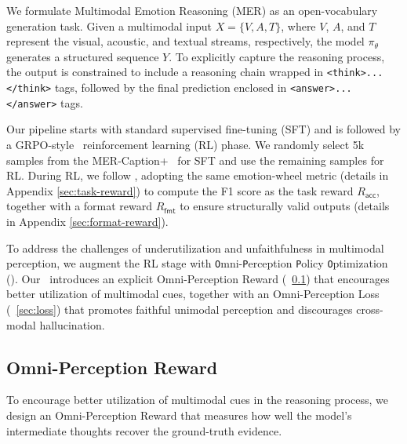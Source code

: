 \documentclass{article}
\theoremstyle{plain}
\theoremstyle{definition}
\theoremstyle{remark}
\begin{document}
We formulate Multimodal Emotion Reasoning (MER) as an open-vocabulary generation task. Given a multimodal input $X = \{V, A, T\}$, where $V$, $A$, and $T$ represent the visual, acoustic, and textual streams, respectively, the model $\pi_\theta$ generates a structured sequence $Y$. To explicitly capture the reasoning process, the output is constrained to include a reasoning chain wrapped in \texttt{<think>...</think>} tags, followed by the final prediction enclosed in \texttt{<answer>...</answer>} tags.

Our pipeline starts with standard supervised fine-tuning (SFT) and is followed by a GRPO-style~\cite{guo2025deepseek} reinforcement learning (RL) phase. We randomly select 5k samples from the MER-Caption+~\cite{lian2025affectgpt} for SFT and use the remaining samples for RL. During RL, we follow \citet{lian2025affectgpt}, adopting the same emotion-wheel metric (details in Appendix \ref{sec:task-reward}) to compute the F1 score as the task reward $R_\mathsf{acc}$, together with a format reward $R_\mathsf{fmt}$ to ensure structurally valid outputs (details in Appendix \ref{sec:format-reward}).



To address the challenges of underutilization and unfaithfulness in multimodal perception, we augment the RL stage with \texttt{O}mni-\texttt{P}erception \texttt{P}olicy \texttt{O}ptimization (\ourmethod). Our \ourmethod~introduces an explicit Omni-Perception Reward (~\cref{sec:reward}) that encourages better utilization of multimodal cues, together with an Omni-Perception Loss (~\cref{sec:loss}) that promotes faithful unimodal perception and discourages cross-modal hallucination.





\subsection{Omni-Perception Reward}
\label{sec:reward}
To encourage better utilization of multimodal cues in the reasoning process, we design an Omni-Perception Reward that measures how well the model’s intermediate thoughts recover the ground-truth evidence. 
\end{document}
